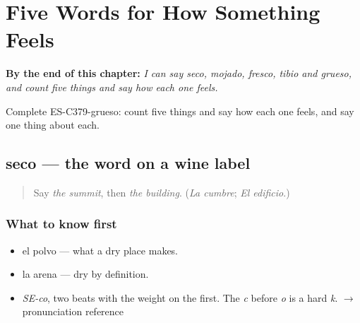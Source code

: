 
\chapter{Five Words for How Something Feels}
\label{ch:seco-y-mojado}

\begin{chapteropening}
\textbf{By the end of this chapter:} \emph{I can say seco, mojado, fresco, tibio and grueso, and count five things and say how each one feels.}

Complete ES-C379-grueso: count five things and say how each one feels, and say one thing about each.
\end{chapteropening}

\section[seco]{seco — the word on a wine label}

\label{lesson:ES-C379-seco}



\begin{quote}
Say \emph{the summit}, then \emph{the building}. (\emph{La cumbre}; \emph{El edificio}.)
\end{quote}

\subsection*{What to know first}
\begin{itemize}
\raggedright
  \item el polvo — what a dry place makes.
  \item la arena — dry by definition.
\end{itemize}

\begin{sounds}
\begin{itemize}
\raggedright
  \item \emph{SE-co}, two beats with the weight on the first. The \emph{c} before \emph{o} is a hard \emph{k}. $\to$ pronunciation reference
\end{itemize}
\end{sounds}

